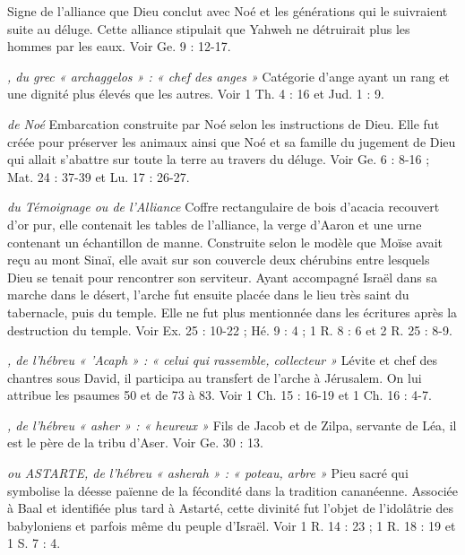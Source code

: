 \begin{multicols}{2}
\textit{}\newline
Signe de l’alliance que Dieu conclut avec Noé et les générations qui le suivraient suite au déluge. Cette alliance stipulait que Yahweh ne détruirait plus les hommes par les eaux. Voir Ge. 9 : 12-17.

\textit{, du grec « archaggelos » : « chef des anges »}\newline
Catégorie d’ange ayant un rang et une dignité plus élevés que les autres. Voir 1 Th. 4 : 16 et Jud. 1 : 9.

\textit{de Noé}\newline
Embarcation construite par Noé selon les instructions de Dieu. Elle fut créée pour préserver les animaux ainsi que Noé et sa famille du jugement de Dieu qui allait s’abattre sur toute la terre au travers du déluge. Voir Ge. 6 : 8-16 ; Mat. 24 : 37-39 et Lu. 17 : 26-27.

\textit{du Témoignage ou de l'Alliance}\newline
Coffre rectangulaire de bois d’acacia recouvert d’or pur, elle contenait les tables de l'alliance, la verge d'Aaron et une urne contenant un échantillon de manne. Construite selon le modèle que Moïse avait reçu au mont Sinaï, elle avait sur son couvercle deux chérubins entre lesquels Dieu se tenait pour rencontrer son serviteur. Ayant accompagné Israël dans sa marche dans le désert, l’arche fut ensuite placée dans le lieu très saint du tabernacle, puis du temple. Elle ne fut plus mentionnée dans les écritures après la destruction du temple. Voir Ex. 25 : 10-22 ; Hé. 9 : 4 ; 1 R. 8 : 6 et 2 R. 25 : 8-9.

\textit{, de l'hébreu « 'Acaph » : « celui qui rassemble, collecteur »}\newline
Lévite et chef des chantres sous David, il participa au transfert de l’arche à Jérusalem. On lui attribue les psaumes 50 et de 73 à 83. Voir 1 Ch. 15 : 16-19 et 1 Ch. 16 : 4-7.

\textit{, de l'hébreu « asher » : « heureux »}\newline
Fils de Jacob et de Zilpa, servante de Léa, il est le père de la tribu d’Aser. Voir Ge. 30 : 13.

\textit{ou ASTARTE, de l’hébreu « asherah » : « poteau, arbre »}\newline
Pieu sacré qui symbolise la déesse païenne de la fécondité dans la tradition cananéenne. Associée à Baal et identifiée plus tard à Astarté, cette divinité fut l’objet de l’idolâtrie des babyloniens et parfois même du peuple d’Israël. Voir 1 R. 14 : 23 ; 1 R. 18 : 19 et 1 S. 7 : 4.


\end{multicols}
